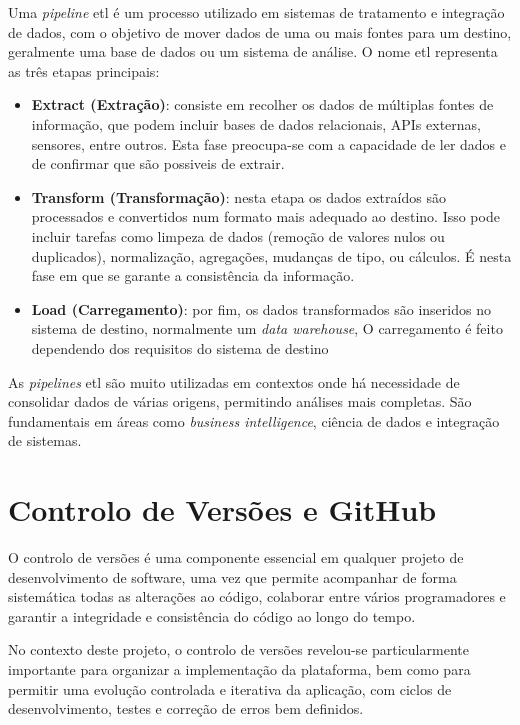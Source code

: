 Uma \textit{pipeline} \gls{etl} é um processo utilizado em sistemas de tratamento e integração de dados, com o objetivo de mover dados de uma ou mais fontes para um destino, geralmente uma base de dados ou um sistema de análise. O nome \gls{etl} representa as três etapas principais:

\begin{itemize}
  \item \textbf{Extract (Extração)}: consiste em recolher os dados de múltiplas fontes de informação, que podem incluir bases de dados relacionais, APIs externas, sensores, entre outros. Esta fase preocupa-se com a capacidade de ler dados e de confirmar que são possiveis de extrair.
  
  \item \textbf{Transform (Transformação)}: nesta etapa os dados extraídos são processados e convertidos num formato mais adequado ao destino. Isso pode incluir tarefas como limpeza de dados (remoção de valores nulos ou duplicados), normalização, agregações, mudanças de tipo, ou cálculos. É nesta fase em que se garante a consistência da informação.

  \item \textbf{Load (Carregamento)}: por fim, os dados transformados são inseridos no sistema de destino, normalmente um \textit{data warehouse},  O carregamento é feito dependendo dos requisitos do sistema de destino

\end{itemize}

As \textit{pipelines} \gls{etl} são muito utilizadas em contextos onde há necessidade de consolidar dados de várias origens, permitindo análises mais completas. São fundamentais em áreas como \textit{business intelligence}, ciência de dados e integração de sistemas.

\chapter{Controlo de Versões e GitHub}

O controlo de versões é uma componente essencial em qualquer projeto de desenvolvimento de software, uma vez que permite acompanhar de forma sistemática todas as alterações ao código, colaborar entre vários programadores e garantir a integridade e consistência do código ao longo do tempo.

No contexto deste projeto, o controlo de versões revelou-se particularmente importante para organizar a implementação da plataforma, bem como para permitir uma evolução controlada e iterativa da aplicação, com ciclos de desenvolvimento, testes e correção de erros bem definidos.

